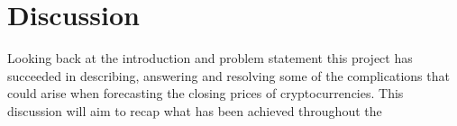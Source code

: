 \chapter{Discussion}
Looking back at the introduction and problem statement this project has succeeded in describing, answering and resolving some of the complications that could arise when forecasting the closing prices of cryptocurrencies. This discussion will aim to recap what has been achieved throughout the 